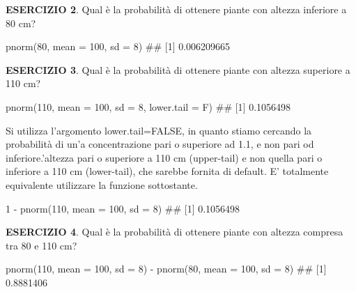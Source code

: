 \documentclass[a4paper,12pt,oneside]{book}
\newenvironment{Shaded}{}{}
\newcommand{\KeywordTok}[1]{#1}
\newcommand{\DataTypeTok}[1]{#1}
\newcommand{\DecValTok}[1]{#1}
\newcommand{\StringTok}[1]{#1}
\newcommand{\CommentTok}[1]{#1}
\newcommand{\OperatorTok}[1]{#1}
\newcommand{\NormalTok}[1]{#1}
\begin{document}
\textbf{ESERCIZIO 2}. Qual è la probabilità di ottenere piante con altezza inferiore a 80 cm?

\begin{Shaded}
\begin{Highlighting}[]
\KeywordTok{pnorm}\NormalTok{(}\DecValTok{80}\NormalTok{, }\DataTypeTok{mean =} \DecValTok{100}\NormalTok{, }\DataTypeTok{sd =} \DecValTok{8}\NormalTok{)}
\CommentTok{## [1] 0.006209665}
\end{Highlighting}
\end{Shaded}

\textbf{ESERCIZIO 3}. Qual è la probabilità di ottenere piante con altezza superiore a 110 cm?

\begin{Shaded}
\begin{Highlighting}[]
\KeywordTok{pnorm}\NormalTok{(}\DecValTok{110}\NormalTok{, }\DataTypeTok{mean =} \DecValTok{100}\NormalTok{, }\DataTypeTok{sd =} \DecValTok{8}\NormalTok{, }\DataTypeTok{lower.tail =}\NormalTok{ F)}
\CommentTok{## [1] 0.1056498}
\end{Highlighting}
\end{Shaded}

Si utilizza l'argomento lower.tail=FALSE, in quanto stiamo cercando la probabilità di un'a concentrazione pari o superiore ad 1.1, e non pari od inferiore.'altezza pari o superiore a 110 cm (upper-tail) e non quella pari o inferiore a 110 cm (lower-tail), che sarebbe fornita di default. E' totalmente equivalente utilizzare la funzione sottostante.

\begin{Shaded}
\begin{Highlighting}[]
\DecValTok{1} \OperatorTok{-}\StringTok{ }\KeywordTok{pnorm}\NormalTok{(}\DecValTok{110}\NormalTok{, }\DataTypeTok{mean =} \DecValTok{100}\NormalTok{, }\DataTypeTok{sd =} \DecValTok{8}\NormalTok{)}
\CommentTok{## [1] 0.1056498}
\end{Highlighting}
\end{Shaded}

\textbf{ESERCIZIO 4}. Qual è la probabilità di ottenere piante con altezza compresa tra 80 e 110 cm?

\begin{Shaded}
\begin{Highlighting}[]
\KeywordTok{pnorm}\NormalTok{(}\DecValTok{110}\NormalTok{, }\DataTypeTok{mean =} \DecValTok{100}\NormalTok{, }\DataTypeTok{sd =} \DecValTok{8}\NormalTok{) }\OperatorTok{-}\StringTok{ }\KeywordTok{pnorm}\NormalTok{(}\DecValTok{80}\NormalTok{, }\DataTypeTok{mean =} \DecValTok{100}\NormalTok{, }\DataTypeTok{sd =} \DecValTok{8}\NormalTok{)}
\CommentTok{## [1] 0.8881406}
\end{Highlighting}
\end{Shaded}
\end{document}
